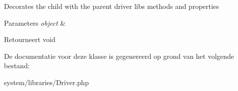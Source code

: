 Decorates the child with the parent driver lib\textquotesingle{}s methods and properties


\begin{DoxyParams}{Parameters}
{\em object} & \\
\hline
\end{DoxyParams}
\begin{DoxyReturn}{Retourneert}
void 
\end{DoxyReturn}


De documentatie voor deze klasse is gegenereerd op grond van het volgende bestand\+:\begin{DoxyCompactItemize}
\item 
system/libraries/Driver.\+php\end{DoxyCompactItemize}
